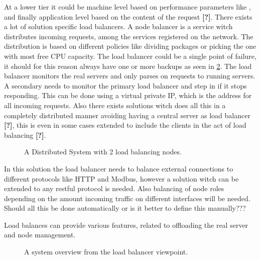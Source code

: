 At a lower tier it could be machine level based on performance parameters like , and finally application level based on the content of the request \textbf{[?]}. %
There exists a lot of solution specific load balancers.
A node balancer is a service witch distributes incoming requests, among the services registered on the network.
The distribution is based on different policies like dividing packages or picking the one with most free CPU capacity.
The load balancer could be a single point of failure, it should for this reason always have one or more backups as seen in \cref{fig:loadBalancingSetup}.
The load balancer monitors the real servers and only parses on requests to running servers.
A secondary needs to monitor the primary load balancer and step in if it stops responding.
This can be done using a virtual private IP, which is the address for all incoming requests. Also there exists solutions witch does all this in a completely distributed manner avoiding having a central server as load balancer  \textbf{[?]}, %
this is even in some cases extended to include the clients in the act of load balancing \textbf{[?]}. %

\begin{figure}
	\centering	
	\scalebox{0.7}{}
	\caption[Distributed System with 2 load balancing nodes]{
		\label{fig:loadBalancingSetup2Balancers} 
		\footnotesize{%
			A Distributed System with 2 load balancing nodes.
		}
	}
\end{figure}

In this solution the load balancer needs to balance external connections to different protocols like HTTP and Modbus, however a solution witch can be extended to any restful protocol is needed.
Also balancing of node roles depending on the amount incoming traffic on different interfaces will be needed.
Should all this be done automatically or is it better to define this manually???

Load balances can provide various features, related to offloading the real server and node management. %



\begin{figure}
	\centering	
	\scalebox{0.7}{}
	\caption[System overview from the load balancer viewpoint]{
		\label{fig:loadBalancingSetup} 
		\footnotesize{%
			A system overview from the load balancer viewpoint.
		}
	}
\end{figure}

